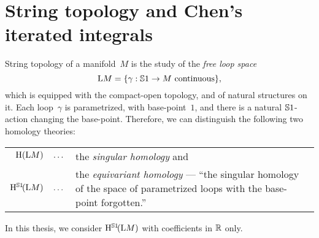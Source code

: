 \documentclass[\MainFolder/Text.tex]{subfiles}
\begin{document}
\section{String topology and Chen's iterated integrals}

String topology of a manifold~$M$ is the study of the \emph{free loop space} 
\[ \mathrm{L} M = \{\gamma: \mathbb{S}{1}\rightarrow M\text{ continuous}\}, \]
which is equipped with the compact-open topology, and of natural structures on it.
Each loop~$\gamma$ is parametrized, with base-point~$1$, and there is a natural $\mathbb{S}{1}$-action changing the base-point.
Therefore, we can distinguish the following two homology theories:
\begin{center}
\begin{tabular}{rl}
 $\mathrm{H}(\mathrm{L} M)\quad\dotsc$& the \emph{singular homology} and \\[1ex]
 $\mathrm{H}^{\mathbb{S}{1}}\!(\mathrm{L} M)\quad\dotsc$ & \parbox[t]{10cm}{the \emph{equivariant homology} --- ``the singular homology of the space of parametrized loops with the base-point forgotten.''}
\end{tabular}
\end{center}
In this thesis, we consider $\mathrm{H}^{\mathbb{S}{1}}\!(\mathrm{L} M)$ with coefficients in $\mathbb{R}$ only.
\end{document}

